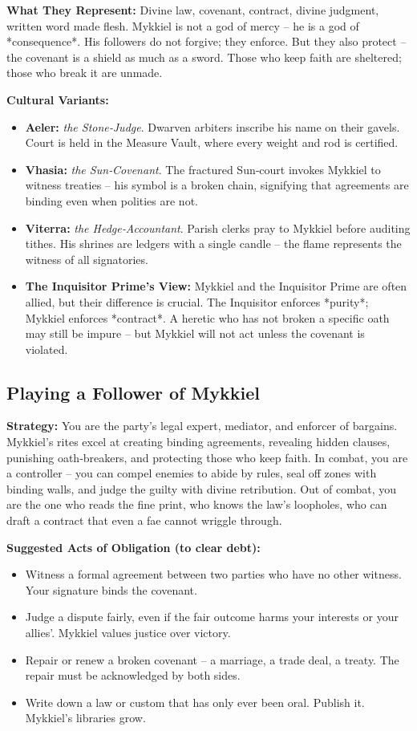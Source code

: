 \documentclass[10pt,a5paper]{book}
\begin{document}
\textbf{What They Represent:} Divine law, covenant, contract, divine judgment, written word made flesh. Mykkiel is not a god of mercy – he is a god of *consequence*. His followers do not forgive; they enforce. But they also protect – the covenant is a shield as much as a sword. Those who keep faith are sheltered; those who break it are unmade.

\textbf{Cultural Variants:}
\begin{itemize}
    \item \textbf{Aeler:} \textit{the Stone‑Judge}. Dwarven arbiters inscribe his name on their gavels. Court is held in the Measure Vault, where every weight and rod is certified.
    \item \textbf{Vhasia:} \textit{the Sun‑Covenant}. The fractured Sun‑court invokes Mykkiel to witness treaties – his symbol is a broken chain, signifying that agreements are binding even when polities are not.
    \item \textbf{Viterra:} \textit{the Hedge‑Accountant}. Parish clerks pray to Mykkiel before auditing tithes. His shrines are ledgers with a single candle – the flame represents the witness of all signatories.
    \item \textbf{The Inquisitor Prime’s View:} Mykkiel and the Inquisitor Prime are often allied, but their difference is crucial. The Inquisitor enforces *purity*; Mykkiel enforces *contract*. A heretic who has not broken a specific oath may still be impure – but Mykkiel will not act unless the covenant is violated.
\end{itemize}

\subsection*{Playing a Follower of Mykkiel}

\textbf{Strategy:} You are the party’s legal expert, mediator, and enforcer of bargains. Mykkiel’s rites excel at creating binding agreements, revealing hidden clauses, punishing oath‑breakers, and protecting those who keep faith. In combat, you are a controller – you can compel enemies to abide by rules, seal off zones with binding walls, and judge the guilty with divine retribution. Out of combat, you are the one who reads the fine print, who knows the law’s loopholes, who can draft a contract that even a fae cannot wriggle through.

\textbf{Suggested Acts of Obligation (to clear debt):}
\begin{itemize}
    \item Witness a formal agreement between two parties who have no other witness. Your signature binds the covenant.
    \item Judge a dispute fairly, even if the fair outcome harms your interests or your allies'. Mykkiel values justice over victory.
    \item Repair or renew a broken covenant – a marriage, a trade deal, a treaty. The repair must be acknowledged by both sides.
    \item Write down a law or custom that has only ever been oral. Publish it. Mykkiel’s libraries grow.
\end{itemize}
\end{document}
